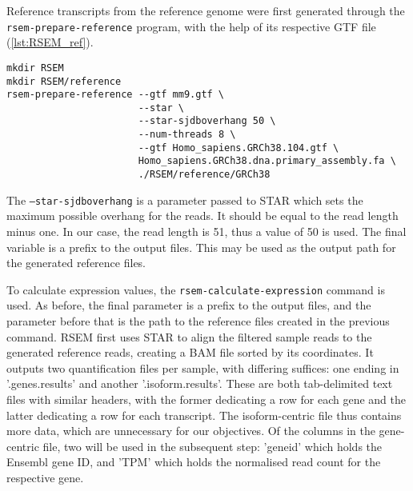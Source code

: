 Reference transcripts from the reference genome were first generated through the \texttt{rsem-prepare-reference} program, with the help of its respective GTF file (\autoref{lst:RSEM_ref}). 


\begin{lstlisting}[caption=RSEM reference generation, label={lst:RSEM_ref}]
mkdir RSEM
mkdir RSEM/reference
rsem-prepare-reference --gtf mm9.gtf \
                       --star \
                       --star-sjdboverhang 50 \
                       --num-threads 8 \
                       --gtf Homo_sapiens.GRCh38.104.gtf \
                       Homo_sapiens.GRCh38.dna.primary_assembly.fa \
                       ./RSEM/reference/GRCh38
\end{lstlisting}

The \texttt{--star-sjdboverhang} is a parameter passed to \ac{STAR} which sets the maximum possible overhang for the reads. It should be equal to the read length minus one. In our case, the read length is 51, thus a value of 50 is used. The final variable is a prefix to the output files. This may be used as the output path for the generated reference files.

To calculate expression values, the \texttt{rsem-calculate-expression} command is used. As before, the final parameter is a prefix to the output files, and the parameter before that is the path to the reference files created in the previous command. RSEM first uses \ac{STAR} to align the filtered sample reads to the generated reference reads, creating a BAM file sorted by its coordinates. It outputs two quantification files per sample, with differing suffices: one ending in '.genes.results' and another '.isoform.results'. These are both tab-delimited text files with similar headers, with the former dedicating a row for each gene and the latter dedicating a row for each transcript. The isoform-centric file thus contains more data, which are unnecessary for our objectives. Of the columns in the gene-centric file, two will be used in the subsequent step: 'gene\textunderscore id' which holds the Ensembl gene ID, and 'TPM' which holds the normalised read count for the respective gene.

